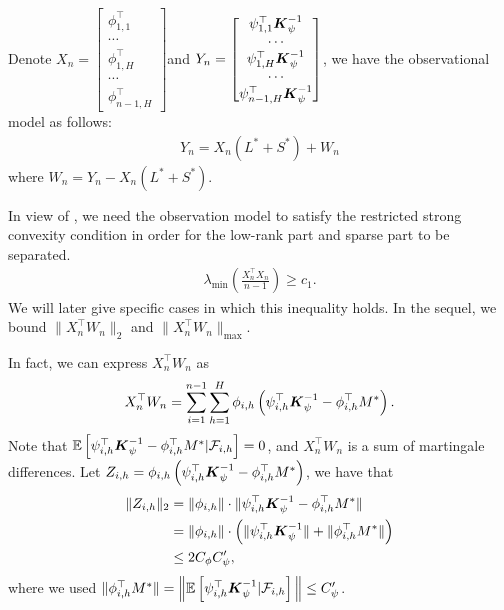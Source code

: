 Denote $X_n=\begin{bmatrix}
\phi_{1,1}^\top\\\cdots\\\phi_{1,H}^\top\\\cdots\\\phi^\top_{n-1,H}
\end{bmatrix}$and $Y_n=\begin{bmatrix}
\psi_{1,1}^\top  \boldsymbol{K}_{\psi}^{-1}\\\cdots\\\psi_{1,H}^\top  \boldsymbol{K}_{\psi}^{-1}\\\cdots\\\psi_{n-1,H}^\top  \boldsymbol{K}_{\psi}^{-1}
\end{bmatrix}$, we have the observational model as follows:
\begin{align*}
Y_n=X_n(L^*+S^*)+W_n
\end{align*}
where $W_n=Y_n-X_n(L^*+S^*)$.


In view of \cite{chai2024structured}, we need the observation model to satisfy the restricted strong convexity condition in order for the low-rank part and sparse part to be separated.
\begin{align}
\label{cond:minimum-eigenvalue}\lambda_{\min}\left(\frac{X_n^\top X_n}{n-1}\right)\ge c_1.\end{align}
We will later give specific cases in which this inequality holds. In the sequel, we bound $\|X_n^\top W_n\|_2$ and $\|X_n^\top W_n\|_{\max}$.

In fact, we can express $X_n^\top W_n$ as 
\begin{align*}
X_n^\top W_n=\sum_{i=1}^{n-1}\sum_{h=1}^H \phi_{i,h}\left(\psi_{i,h}^\top \boldsymbol{K}_{\psi}^{-1}-\phi_{i,h}^\top   M^*\right).
\end{align*}
Note that $\mathbb{E}\left[\psi_{i,h}^\top \boldsymbol{K}_{\psi}^{-1}-\phi_{i,h}^\top   M^*|{\cal F}_{i,h}\right]=0$, and $X_n^\top W_n$ is a sum of martingale differences.
Let $Z_{i,h}=\phi_{i,h}\left(\psi_{i,h}^\top \boldsymbol{K}_{\psi}^{-1}-\phi_{i,h}^\top   M^*\right)$, we have that 
\begin{align*}\|Z_{i,h}\|_2&=\|\phi_{i,h}\|\cdot \|\psi_{i,h}^\top \boldsymbol{K}_{\psi}^{-1}-\phi_{i,h}^\top   M^*\|\\&=\|\phi_{i,h}\|\cdot \left(\|\psi_{i,h}^\top \boldsymbol{K}_{\psi}^{-1}\|+\|\phi_{i,h}^\top   M^*\|\right)\\&\le 2C_\phi C'_\psi,
\end{align*}
where we used $\|\phi_{i,h}^\top   M^*\|=\Big\|\mathbb{E}\left[\psi_{i,h}^\top \boldsymbol{K}_{\psi}^{-1}|{\cal F}_{i,h}\right]\Big\|\le C'_\psi$.

